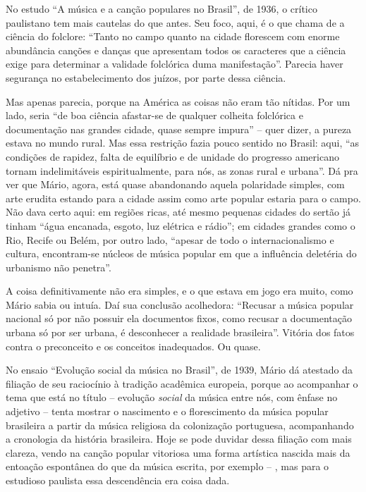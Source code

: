 No estudo ``A música e a canção populares no Brasil'', de 1936, o
crítico paulistano tem mais cautelas do que antes. Seu foco, aqui, é o
que chama de a ciência do folclore: ``Tanto no campo quanto na cidade
florescem com enorme abundância canções e danças que apresentam todos os
caracteres que a ciência exige para determinar a validade folclórica
duma manifestação''. Parecia haver segurança no estabelecimento dos
juízos, por parte dessa ciência.

Mas apenas parecia, porque na América as coisas não eram tão nítidas.
Por um lado, seria ``de boa ciência afastar-se de qualquer colheita
folclórica e documentação nas grandes cidade, quase sempre impura'' --
quer dizer, a pureza estava no mundo rural. Mas essa restrição fazia
pouco sentido no Brasil: aqui, ``as condições de rapidez, falta de
equilíbrio e de unidade do progresso americano tornam indelimitáveis
espiritualmente, para nós, as zonas rural e urbana''. Dá pra ver que
Mário, agora, está quase abandonando aquela polaridade simples, com arte
erudita estando para a cidade assim como arte popular estaria para o
campo. Não dava certo aqui: em regiões ricas, até mesmo pequenas cidades
do sertão já tinham ``água encanada, esgoto, luz elétrica e rádio''; em
cidades grandes como o Rio, Recife ou Belém, por outro lado, ``apesar de
todo o internacionalismo e cultura, encontram-se núcleos de música
popular em que a influência deletéria do urbanismo não penetra''.

A coisa definitivamente não era simples, e o que estava em jogo era
muito, como Mário sabia ou intuía. Daí sua conclusão acolhedora:
``Recusar a música popular nacional só por não possuir ela documentos
fixos, como recusar a documentação urbana só por ser urbana, é
desconhecer a realidade brasileira''. Vitória dos fatos contra o
preconceito e os conceitos inadequados. Ou quase.

No ensaio ``Evolução social da música no Brasil'', de 1939, Mário dá
atestado da filiação de seu raciocínio à tradição acadêmica europeia,
porque ao acompanhar o tema que está no título -- evolução \emph{social}
da música entre nós, com ênfase no adjetivo -- tenta mostrar o
nascimento e o florescimento da música popular brasileira a partir da
música religiosa da colonização portuguesa, acompanhando a cronologia da
história brasileira. Hoje se pode duvidar dessa filiação com mais
clareza, vendo na canção popular vitoriosa uma forma artística nascida
mais da entoação espontânea do que da música escrita, por exemplo -- ,
mas para o estudioso paulista essa descendência era coisa dada.

